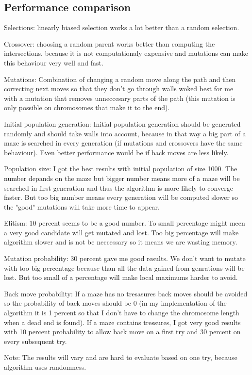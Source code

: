 \documentclass[12pt]{article} %
\begin{document}
\subsection{Performance comparison}
Selections: linearly biased selection works a lot better than a random selection.

Crossover: choosing a random parent works better than computing the intersections, because it is not computationaly expensive and mutations
can make this behaviour very well and fast.

Mutations: Combination of changing a random move along the path and then correcting next moves so that they don't go through walls woked best for me
with a mutation that removes unneccesary parts of the path (this mutation is only possible on chromosomes that make it to the end).

Initial population generation: Initial population generation should be generated randomly and should take walls into account, because in that way a big part
of a maze is searched in every generation (if mutations and crossovers have the same behaviour). Even better performance would be if back moves are less
likely.

Population size: I got the best results with initial population of size 1000. The number depands on the maze but bigger number means more of a maze will
be searched in first generation and thus the algorithm is more likely to converge faster. But too big number means every generation will be computed slower
so the "good" mutations will take more time to appear.

Elitism: 10 percent seems to be a good number. To small percentage might meen a very good candidate will get mutated and lost. Too big percentage will 
make algorithm slower and is not be neccessary so it means we are wasting memory.

Mutation probability: 30 percent gave me good results. We don't want to mutate with too big percentage because than all the data gained from genrations
will be lost. But too small of a percentage will make local maximums harder to avoid.

Back move probability: If a maze has no tresasures back moves should be avoided so the probability of back moves should be 0 (in my implementation
of the algorithm it is 1 percent so that I don't have to change the chromosome length when a dead end is found). If a maze contains tressures, I got very
good results with 10 percent probability to allow back move on a first try and 30 percent on every subsequent try.

Note: The results will vary and are hard to evaluate based on one try, because algorithm uses randomness.
\end{document}
